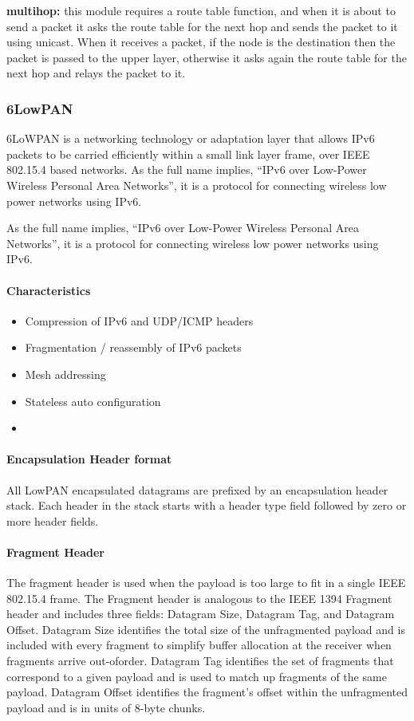 \textbf{multihop:} this module requires a route table function,
	and when it is about to send a packet it asks the route table for the next hop and sends the packet to it using unicast.
When it receives a packet,
	if the node is the destination then the packet is passed to the upper layer,
	otherwise it asks again the route table for the next hop and relays the packet to it.

\subsubsection{6LowPAN}

6LoWPAN is a networking technology or adaptation layer that allows IPv6 packets to be carried efficiently within a small link layer frame,
	over IEEE 802.15.4 based networks.
As the full name implies,
	“IPv6 over Low-Power Wireless Personal Area Networks”,
	it is a protocol for connecting wireless low power networks using IPv6.

As the full name implies,
	“IPv6 over Low-Power Wireless Personal Area Networks”,
	it is a protocol for connecting wireless low power networks using IPv6.

\paragraph{Characteristics}
	\begin{itemize}
		\item Compression of IPv6 and UDP/ICMP headers
		\item Fragmentation / reassembly of IPv6 packets
		\item Mesh addressing
		\item Stateless auto configuration
		\item 
	\end{itemize}
	
\paragraph{Encapsulation Header format}
All LowPAN encapsulated datagrams are prefixed by an encapsulation header stack.
Each header in the stack starts with a header type field followed by zero or more header fields.

\paragraph{Fragment Header}
The fragment header is used when the payload is too large to fit in a single IEEE 802.15.4 frame.
The Fragment header is analogous to the IEEE 1394 Fragment header and includes three fields:
	Datagram Size,
	Datagram Tag,
	and Datagram Offset.
Datagram Size identifies the total size of the unfragmented payload and is included with every fragment to simplify buffer allocation at the receiver when fragments arrive out-oforder.
Datagram Tag identifies the set of fragments that correspond to a given payload and is used to match up fragments of the same payload.
Datagram Offset identifies the fragment’s offset within the unfragmented payload and is in units of 8-byte chunks.

